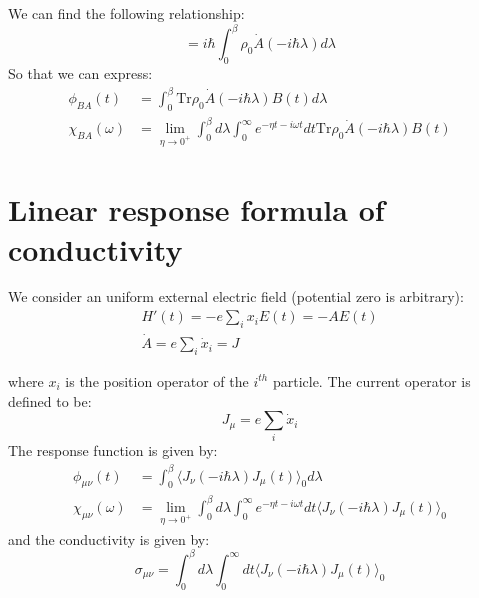 \documentclass{article}
\begin{document}
We can find the following relationship:
\begin{equation}
    [\rho_0, A] = i\hbar \int_0^{\beta} \rho_0 \dot{A}(-i\hbar\lambda) d\lambda
\end{equation}
So that we can express:
\begin{align}
    \phi_{BA} (t) &= \int_0^{\beta} \text{Tr} \rho_0 \dot{A}(-i\hbar\lambda) B(t) d\lambda \\
    \chi_{BA}(\omega) &= 
    \lim_{\eta\to 0^+} \int_0^{\beta} d\lambda \int_{0}^{\infty} e^{-\eta t-i\omega t} dt \text{Tr} \rho_0 \dot{A}(-i\hbar\lambda) B(t)
\end{align}

\section{Linear response formula of conductivity}
We consider an uniform external electric field (potential zero is arbitrary):
\begin{gather}
    H'(t) = -e \sum_i x_i E(t) = - A E(t) \\
    \dot{A} = e \sum_i \dot{x}_i = J
\end{gather}

where $x_i$ is the position operator of the $i^{th}$ particle. The current operator is 
defined to be:
\begin{equation}
    J_{\mu} = e \sum_i \dot{x}_i
\end{equation}
The response function is given by:
\begin{align}
    \phi_{\mu\nu} (t) &= \int_0^{\beta} \langle J_{\nu}(-i\hbar\lambda) J_{\mu}(t) \rangle_0 d\lambda \\
    \chi_{\mu\nu}(\omega)&= 
    \lim_{\eta\to 0^+} \int_0^{\beta} d\lambda \int_{0}^{\infty} e^{-\eta t-i\omega t} dt  \langle J_{\nu}(-i\hbar\lambda) J_{\mu}(t) \rangle_0
\end{align}
and the conductivity is given by:
\begin{equation}
    \sigma_{\mu\nu} = \int_0^{\beta} d\lambda \int_{0}^{\infty} dt \langle J_{\nu}(-i\hbar\lambda) J_{\mu}(t) \rangle_0
\end{equation}

\pagebreak
\end{document}

